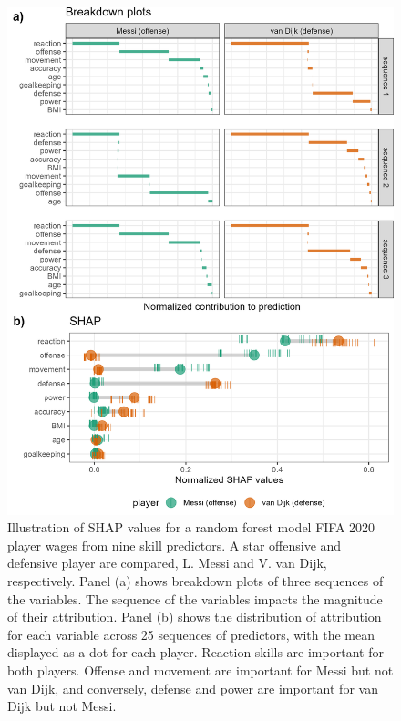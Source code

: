 \documentclass[
]{article}
\begin{document}
\begin{figure}

{\centering \includegraphics[width=0.85\linewidth]{./figures/shap_distr_bd} 

}

\caption{Illustration of SHAP values for a random forest model FIFA 2020 player wages from nine skill predictors. A star offensive and defensive player are compared, L. Messi and V. van Dijk, respectively. Panel (a) shows breakdown plots of three sequences of the variables. The sequence of the variables impacts the magnitude of their attribution. Panel (b) shows the distribution of attribution for each variable across 25 sequences of predictors, with the mean displayed as a dot for each player. Reaction skills are important for both players. Offense and movement are important for Messi but not van Dijk, and conversely, defense and power are important for van Dijk but not Messi.}\label{fig:shapdistrbd}
\end{figure}
\end{document}

